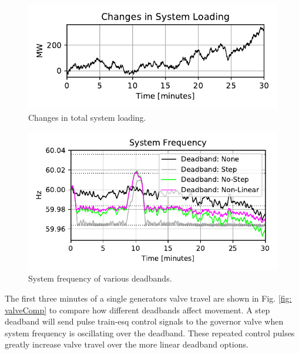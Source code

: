 \begin{figure}[!ht]
\centering
\includegraphics[width=\linewidth]{figures/miniWECCuniAccPloadChange}
\caption{Changes in total system loading.}
\label{fig: systemLoading}
\end{figure}

\begin{figure}[!ht]
\centering
\includegraphics[width=\linewidth]{figures/miniWECCnoiseNLdroopDBFreq}
\caption{System frequency of various deadbands.}
\label{fig: sysFreqDB}
\end{figure}

The first three minutes of a single generators valve travel are shown in Fig. \ref{fig: valveComp} to compare how different deadbands affect movement.
A step deadband will send pulse train-esq control signals to the governor valve when system frequency is oscillating over the deadband. 
These repeated control pulses greatly increase valve travel over the more linear deadband options.

